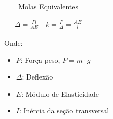 \documentclass{article}
\begin{document}
\begin{table}[h]
\begin{tabular}{|c|c|c|c|}
\begin{minipage}{.45\textwidth}
                        \end{minipage}
                        &
                        $\Delta = \frac{Pl}{AE}$
                        &
                        $k = \frac{P}{\Delta} = \frac{AE}{l}$ \\ \hline
                    \end{tabular}
                    \label{tab:molas_equivalentes}
                    \caption{Molas Equivalentes}
                \end{table}

                Onde: 
                \begin{itemize}
                    \item $P$: Força peso, $P = m\cdot g$
                    \item $\Delta$: Deflexão
                    \item $E$: Módulo de Elasticidade
                    \item $I$: Inércia da seção transversal
                \end{itemize}

                \newpage
\end{document}
